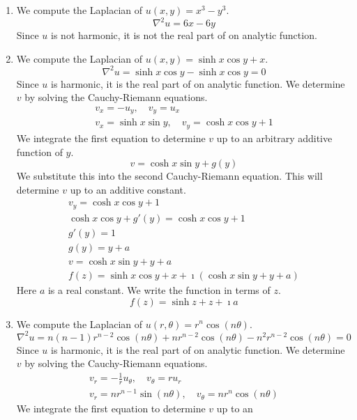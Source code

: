 {\begin{Solution}
  \label{solution real part x3 y3}
  \begin{enumerate}
  \item 
    We compute the Laplacian of $u(x,y) = x^3 - y^3$.
    \[
    \nabla^2 u = 6 x - 6 y
    \]
    Since $u$ is not harmonic, it is not the real part of on analytic function.
  \item 
    We compute the Laplacian of $u(x,y) = \sinh x \cos y + x$.
    \[
    \nabla^2 u = \sinh x \cos y - \sinh x \cos y = 0
    \]
    Since $u$ is harmonic, it is the real part of on analytic function.
    We determine $v$ by solving the Cauchy-Riemann equations.
    \begin{gather*}
      v_x = - u_y, \quad v_y = u_x
      \\
      v_x = \sinh x \sin y, \quad v_y = \cosh x \cos y + 1
    \end{gather*}
    We integrate the first equation to determine $v$ up to an 
    arbitrary additive function of $y$.
    \[
    v = \cosh x \sin y + g(y)
    \]
    We substitute this into the second Cauchy-Riemann equation.  This will 
    determine $v$ up to an additive constant.
    \begin{gather*}
      v_y = \cosh x \cos y + 1
      \\
      \cosh x \cos y + g'(y) = \cosh x \cos y + 1
      \\
      g'(y) = 1
      \\
      g(y) = y + a
      \\
      v = \cosh x \sin y + y + a
      \\
      f(z) = \sinh x \cos y + x + \imath ( \cosh x \sin y + y + a )
    \end{gather*}
    Here $a$ is a real constant.  We write the function in terms of $z$.
    \[
    f(z) = \sinh z + z + \imath a
    \]
  \item
    We compute the Laplacian of $u(r,\theta) = r^n \cos(n \theta)$.
    \[
    \nabla^2 u = n (n-1) r^{n-2} \cos(n \theta) + n r^{n-2} \cos(n \theta) - n^2 r^{n-2} \cos(n \theta)
    = 0
    \]
    Since $u$ is harmonic, it is the real part of on analytic function.
    We determine $v$ by solving the Cauchy-Riemann equations.
    \begin{gather*}
      v_r = - \frac{1}{r} u_\theta, \quad v_\theta = r u_r
      \\
      v_r = n r^{n-1} \sin(n \theta), \quad v_\theta = n r^n \cos(n \theta)
    \end{gather*}
    We integrate the first equation to determine $v$ up to an 

\end{enumerate}
\end{Solution}}
